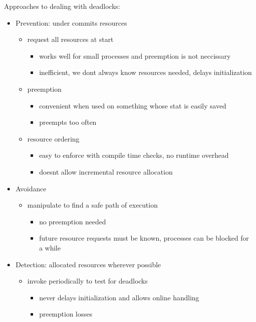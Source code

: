 \documentclass[12pt]{article}
\begin{document}
Approaches to dealing with deadlocks:
\begin{itemize}
  \item Prevention: under commits resources
  \begin{itemize}
    \item request all resources at start
    \begin{itemize}
      \item works well for small processes and preemption is not neccissary
      \item inefficient, we dont always know resources needed, delays initialization
    \end{itemize}
    \item preemption
    \begin{itemize}
      \item convenient when used on something whose stat is easily saved
      \item preempts too often
    \end{itemize}
    \item resource ordering
    \begin{itemize}
      \item easy to enforce with compile time checks, no runtime overhead
      \item doesnt allow incremental resource allocation
    \end{itemize}
  \end{itemize}
  \item Avoidance
  \begin{itemize}
    \item manipulate to find a safe path of execution
    \begin{itemize}
      \item no preemption needed
      \item future resource requests must be known, processes can be blocked for a while
    \end{itemize}
  \end{itemize}
  \item Detection: allocated resources wherever possible
  \begin{itemize}
    \item invoke periodically to test for deadlocks
    \begin{itemize}
      \item never delays initialization and allows online handling
      \item preemption losses
    \end{itemize}
  \end{itemize}
\end{itemize}
\end{document}
